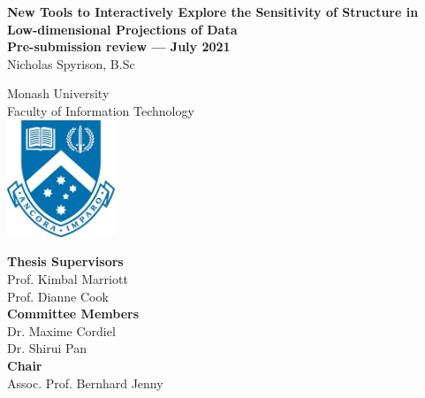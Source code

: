 \documentclass[
  11,
]{article}
\author{}
\date{\vspace{-2.5em}}
\begin{document}

\onehalfspacing
{}

\begin{center}
\huge{\textbf{New Tools to Interactively Explore the Sensitivity of Structure in Low-dimensional Projections of Data}}\\
\vspace*{1\baselineskip}
\Large{\textbf{Pre-submission review --- July 2021}}\\
\LARGE{Nicholas Spyrison, B.Sc}\\
\vspace*{1\baselineskip}

\LARGE{Monash University}\\
\Large{Faculty of Information Technology}\\
\vspace*{1\baselineskip}
\includegraphics[height = 3.5cm]{./figures/crest.jpg}\\
\vspace*{1\baselineskip}

\Large{\textbf{Thesis Supervisors}}\\
Prof. Kimbal Marriott\\
Prof. Dianne Cook\\
\vspace*{1\baselineskip}
\Large{\textbf{Committee Members}}\\
Dr. Maxime Cordiel\\
Dr. Shirui Pan\\
\vspace*{1\baselineskip}
\Large{\textbf{Chair}}\\
Assoc. Prof. Bernhard Jenny\\
\end{center}

\doublespacing

\newpage
{}
\end{document}
